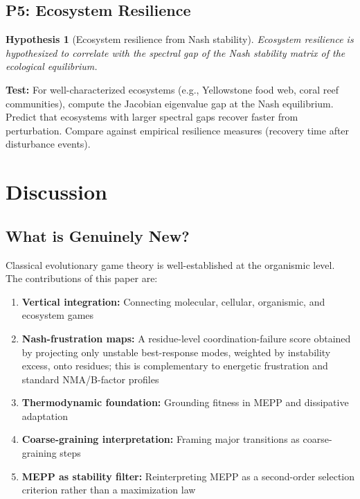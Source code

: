 \documentclass[12pt,a4paper]{article}
\newtheorem{hypothesis}{Hypothesis}
\theoremstyle{remark}
\begin{document}
\subsection{P5: Ecosystem Resilience}

\begin{hypothesis}[Ecosystem resilience from Nash stability]
Ecosystem resilience is hypothesized to correlate with the spectral gap of the Nash stability matrix of the ecological equilibrium.
\end{hypothesis}

\textbf{Test:} For well-characterized ecosystems (e.g., Yellowstone food web, coral reef communities), compute the Jacobian eigenvalue gap at the Nash equilibrium. Predict that ecosystems with larger spectral gaps recover faster from perturbation. Compare against empirical resilience measures (recovery time after disturbance events).

\section{Discussion}
\label{sec:discussion}

\subsection{What is Genuinely New?}

Classical evolutionary game theory is well-established at the organismic level. The contributions of this paper are:
\begin{enumerate}
    \item \textbf{Vertical integration:} Connecting molecular, cellular, organismic, and ecosystem games
    \item \textbf{Nash-frustration maps:} A residue-level coordination-failure score obtained by projecting only unstable best-response modes, weighted by instability excess, onto residues; this is complementary to energetic frustration and standard NMA/B-factor profiles
    \item \textbf{Thermodynamic foundation:} Grounding fitness in MEPP and dissipative adaptation
    \item \textbf{Coarse-graining interpretation:} Framing major transitions as coarse-graining steps
    \item \textbf{MEPP as stability filter:} Reinterpreting MEPP as a second-order selection criterion rather than a maximization law
\end{enumerate}
\end{document}
